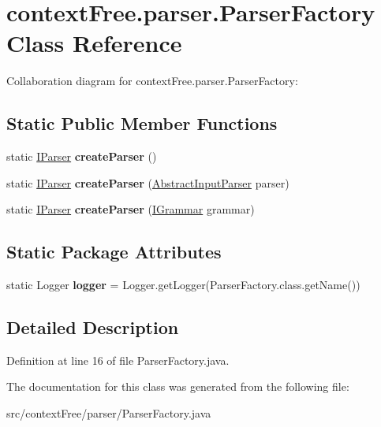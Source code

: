 \hypertarget{classcontext_free_1_1parser_1_1_parser_factory}{\section{context\-Free.\-parser.\-Parser\-Factory Class Reference}
\label{classcontext_free_1_1parser_1_1_parser_factory}
}


Collaboration diagram for context\-Free.\-parser.\-Parser\-Factory\-:
\subsection*{Static Public Member Functions}
\begin{DoxyCompactItemize}
\item 
\hypertarget{classcontext_free_1_1parser_1_1_parser_factory_ace675bb41d96bc1933cafbb04e34a928}{static \hyperlink{interfacecontext_free_1_1parser_1_1_i_parser}{I\-Parser} {\bfseries create\-Parser} ()}\label{classcontext_free_1_1parser_1_1_parser_factory_ace675bb41d96bc1933cafbb04e34a928}

\item 
\hypertarget{classcontext_free_1_1parser_1_1_parser_factory_a18495bcc1663076b276180a3c695e5de}{static \hyperlink{interfacecontext_free_1_1parser_1_1_i_parser}{I\-Parser} {\bfseries create\-Parser} (\hyperlink{classinput_parser_1_1_abstract_input_parser}{Abstract\-Input\-Parser} parser)}\label{classcontext_free_1_1parser_1_1_parser_factory_a18495bcc1663076b276180a3c695e5de}

\item 
\hypertarget{classcontext_free_1_1parser_1_1_parser_factory_aa1cf87208ec422991a7bd454358b8161}{static \hyperlink{interfacecontext_free_1_1parser_1_1_i_parser}{I\-Parser} {\bfseries create\-Parser} (\hyperlink{interfacecontext_free_1_1grammar_1_1_i_grammar}{I\-Grammar} grammar)}\label{classcontext_free_1_1parser_1_1_parser_factory_aa1cf87208ec422991a7bd454358b8161}

\end{DoxyCompactItemize}
\subsection*{Static Package Attributes}
\begin{DoxyCompactItemize}
\item 
\hypertarget{classcontext_free_1_1parser_1_1_parser_factory_a9f3c0ca552f2383e6da4ccabfdd4585d}{static Logger {\bfseries logger} = Logger.\-get\-Logger(Parser\-Factory.\-class.\-get\-Name())}\label{classcontext_free_1_1parser_1_1_parser_factory_a9f3c0ca552f2383e6da4ccabfdd4585d}

\end{DoxyCompactItemize}


\subsection{Detailed Description}


Definition at line 16 of file Parser\-Factory.\-java.



The documentation for this class was generated from the following file\-:\begin{DoxyCompactItemize}
\item 
src/context\-Free/parser/Parser\-Factory.\-java\end{DoxyCompactItemize}
